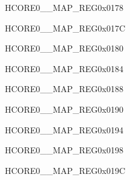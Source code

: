\begin{register}{H}{CORE0\_\_MAP\_REG}{0x0178}\label{regdesc:CORE0USBOTGENDPMULTIPROCINTMAPREG}
\end{register}\vspace{-3em}


\begin{register}{H}{CORE0\_\_MAP\_REG}{0x017C}\label{regdesc:CORE0JPEGINTMAPREG}
\end{register}\vspace{-3em}


\begin{register}{H}{CORE0\_\_MAP\_REG}{0x0180}\label{regdesc:CORE0PPAINTMAPREG}
\end{register}\vspace{-3em}


\begin{register}{H}{CORE0\_\_MAP\_REG}{0x0184}\label{regdesc:CORE0CORE0TRACEINTMAPREG}
\end{register}\vspace{-3em}


\begin{register}{H}{CORE0\_\_MAP\_REG}{0x0188}\label{regdesc:CORE0CORE1TRACEINTMAPREG}
\end{register}\vspace{-3em}




\begin{register}{H}{CORE0\_\_MAP\_REG}{0x0190}\label{regdesc:CORE0ISPINTMAPREG}
\end{register}\vspace{-3em}


\begin{register}{H}{CORE0\_\_MAP\_REG}{0x0194}\label{regdesc:CORE0I3CMSTINTMAPREG}
\end{register}\vspace{-3em}


\begin{register}{H}{CORE0\_\_MAP\_REG}{0x0198}\label{regdesc:CORE0I3CSLVINTMAPREG}
\end{register}\vspace{-3em}


\begin{register}{H}{CORE0\_\_MAP\_REG}{0x019C}\label{regdesc:CORE0USBOTG11INTMAPREG}
\end{register}\vspace{-3em}


